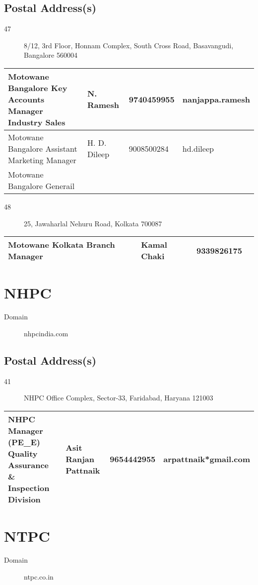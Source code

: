 \documentclass[a4paper, 11pt, twoside]{book}
\begin{document}
\subsection*{Postal Address(s)}
\begin{description}
\item [47]8/12, 3rd Floor, Honnam Complex, South Cross Road, Basavangudi, Bangalore 560004
\end{description}
\begin{tabular}{|p{4cm}|p{2cm}|p{2cm}|p{3cm}|}
\hline
Motowane Bangalore Key Accounts Manager Industry Sales & N. Ramesh & 9740459955 & nanjappa.ramesh \\ \hline
Motowane Bangalore Assistant Marketing Manager & H. D. Dileep & 9008500284 & hd.dileep \\ \hline
Motowane Bangalore Generail & & &  \\ \hline
\end{tabular}
\begin{description}
\item [48]25, Jawaharlal Nehuru Road, Kolkata 700087
\end{description}
\begin{tabular}{|p{4cm}|p{2cm}|p{2cm}|p{3cm}|}
\hline
Motowane Kolkata Branch Manager & Kamal Chaki & 9339826175 &  \\ \hline
\end{tabular}
\section{NHPC}\label{com:30}
\begin{description}
\item[Domain]nhpcindia.com
\end{description}
\subsection*{Postal Address(s)}
\begin{description}
\item [41]NHPC Office Complex, Sector-33, Faridabad, Haryana 121003
\end{description}
\begin{tabular}{|p{4cm}|p{2cm}|p{2cm}|p{3cm}|}
\hline
NHPC Manager (PE\_E) Quality Assurance \& Inspection Division & Asit Ranjan Pattnaik & 9654442955 & arpattnaik*gmail.com \\ \hline
\end{tabular}
\section{NTPC}\label{com:24}
\begin{description}
\item[Domain]ntpc.co.in
\end{description}
\end{document}
